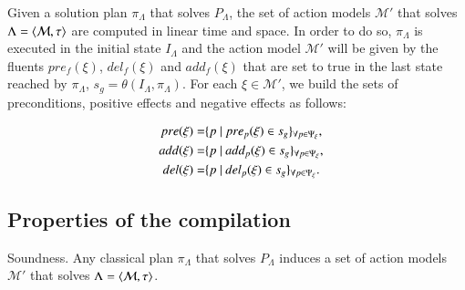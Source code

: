 Given a solution plan $\pi_\Lambda$ that solves $P_{\Lambda}$, the set of action models $\mathcal{M}'$ that solves $\Lambda={\langle \mathcal{M},\tau \rangle}$ are computed in linear time and space. In order to do so, $\pi_\Lambda$ is executed in the initial state $I_{\Lambda}$ and the action model $\mathcal{M}'$ will be given by the fluents $pre_f(\xi)$, $del_f(\xi)$ and $add_f(\xi)$ that are set to true in the last state reached by $\pi_\Lambda$, $s_g=\theta(I_\Lambda,\pi_\Lambda)$. For each $\xi \in \mathcal{M'}$, we build the sets of preconditions, positive effects and negative effects as follows:


\begin{small}
	\begin{align*}
	\hspace*{7pt}pre(\xi)=& \{p ~|~ pre_p(\xi) \in s_g\}_{\forall p \in \Psi_\xi},\\
	\hspace*{7pt}add(\xi)=& \{p ~|~ add_p(\xi) \in s_g\}_{\forall p \in \Psi_\xi},\\
	\hspace*{7pt}del(\xi)=& \{p ~|~ del_p(\xi) \in s_g\}_{\forall p \in \Psi_\xi}.
	\end{align*}
\end{small}


\subsection{Properties of the compilation}


\begin{mylemma}
Soundness. Any classical plan $\pi_\Lambda$ that solves $P_{\Lambda}$ induces a set of action models $\mathcal{M}'$ that solves $\Lambda={\langle \mathcal{M},\tau \rangle}$.
\end{mylemma}

